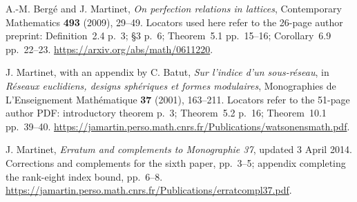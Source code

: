 A.-M. Berg\'e and J. Martinet,
\emph{On perfection relations in lattices},
Contemporary Mathematics \textbf{493} (2009), 29--49.
Locators used here refer to the 26-page author preprint:
Definition~2.4 p.~3; \S3 p.~6; Theorem~5.1 pp.~15--16;
Corollary~6.9 pp.~22--23.
\url{https://arxiv.org/abs/math/0611220}.

J. Martinet, with an appendix by C. Batut,
\emph{Sur l'indice d'un sous-r\'eseau},
in \emph{R\'eseaux euclidiens, designs sph\'eriques et formes modulaires},
Monographies de L'Enseignement Math\'ematique \textbf{37}
(2001), 163--211.
Locators refer to the 51-page author PDF:
introductory theorem p.~3; Theorem~5.2 p.~16;
Theorem~10.1 pp.~39--40.
\url{https://jamartin.perso.math.cnrs.fr/Publications/watsonensmath.pdf}.

J. Martinet,
\emph{Erratum and complements to Monographie 37},
updated 3 April 2014.
Corrections and complements for the sixth paper, pp.~3--5;
appendix completing the rank-eight index bound, pp.~6--8.
\url{https://jamartin.perso.math.cnrs.fr/Publications/erratcompl37.pdf}.
